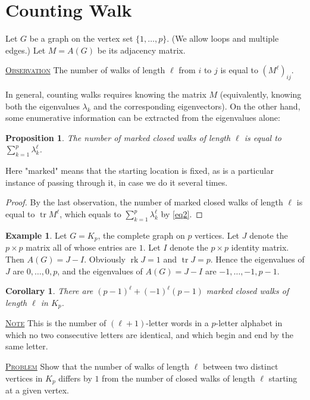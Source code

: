 \documentclass{report}
\def \tr {\operatorname{tr}}
\def \rk {\operatorname{rk}}
\newcommand{\fancyem}[1]{\underline{\textsc{#1}}}
\newtheorem{corollary}{Corollary}[section]
\newtheorem{proposition}{Proposition}[section]
\theoremstyle{definition}
\newtheorem{example}{Example}[section]
\theoremstyle{remark}
\numberwithin{equation}{section}
\begin{document}
\section{Counting Walk}
Let $G$ be a graph on the vertex set $\{1, \ldots, p\}$. (We allow loops and multiple edges.) Let $M = A(G)$ be its adjacency matrix.

\fancyem{Observation} The number of walks of length $\ell$ from $i$ to $j$ is equal to $(M^\ell)_{ij}$.

In general, counting walks requires knowing the matrix $M$ (equivalently, knowing both the eigenvalues $\lambda_k$ and the corresponding eigenvectors). On the other hand, some enumerative information can be extracted from the eigenvalues alone:

\begin{proposition}
The number of marked closed walks of length $\ell$ is equal to $\sum_{k=1}^p \lambda^\ell_k$.
\end{proposition}
Here "marked" means that the starting location is fixed, as is a particular instance
of passing through it, in case we do it several times.

\begin{proof}
By the last observation, the number of marked closed walks of length $\ell$ is equal to $\tr M^\ell$, which equals to $\sum_{k=1}^p \lambda^\ell_k$ by \eqref{eq2}.
\end{proof}

\begin{example}
Let $G = K_p$, the complete graph on $p$ vertices. Let $J$ denote the $p \times p$ matrix all of whose entries are $1$. Let $I$ denote the $p \times p$ identity matrix. Then $A(G) = J - I$. Obviously $\rk J = 1$ and $\tr J = p$. Hence the eigenvalues of $J$ are $0, \ldots, 0, p$, and the eigenvalues of $A(G) = J - I$ are $-1, \ldots, -1, p-1$.
\end{example}

\begin{corollary}
There are $(p-1)^\ell + (-1)^\ell(p-1)$ marked closed walks of length $\ell$ in $K_p$.
\end{corollary}

\fancyem{Note} This is the number of $(\ell+1)$-letter words in a $p$-letter alphabet in which no two consecutive letters are identical, and which begin and end by the same letter.

\fancyem{Problem} Show that the number of walks of length $\ell$ between two distinct vertices in $K_p$ differs by $1$ from the number of closed walks of length $\ell$ starting at a given vertex.
\end{document}
